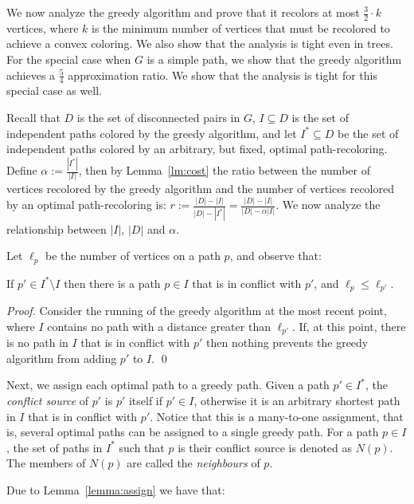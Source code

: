 We now analyze the greedy algorithm and prove that it recolors at most 
$\frac{3}{2} \cdot k$ vertices, 
where $k$ is the minimum number of vertices that must be recolored to achieve a convex
coloring.
%
We also show that the analysis is tight even in trees.
%
For the special case when $G$ is a simple path, 
we show that the greedy algorithm achieves a $\frac{5}{4}$ approximation ratio.
We show that the analysis is tight for this special case as well.

Recall that $D$ is the set of disconnected pairs in $G$, 
$I \subseteq D$ is the set of independent paths colored by the greedy algorithm, 
and let $I^* \subseteq D$ be the set of independent paths colored by an arbitrary, 
but fixed,
optimal path-recoloring.  
%
Define $\alpha := \frac{|I^*|}{|I|}$,
then by Lemma~\ref{lm:cost} the ratio between the number of 
vertices recolored by the greedy algorithm and the number of vertices
recolored by an optimal path-recoloring is:
$
r := \frac{|D| - |I|}{|D| - |I^*|}
= \frac{|D| - |I|}{|D| - \alpha |I|}
$.
We now analyze the relationship between $|I|$, $|D|$ and $\alpha$.

Let $\ell_p$ be the number of vertices on a path $p$, and observe that:

\begin{lemma}
\label{lemma:assign}
If $p' \in I^* \setminus I$ then there is a path $p \in I$ that is in
conflict with $p'$, and $\ell_p \leq \ell_{p'}$.
\end{lemma}
\begin{proof}
Consider the running of the greedy algorithm at the most recent point,
where $I$ contains no path with a distance greater than $\ell_{p'}$.  If,
at this point, there is no path in $I$ that is in conflict with $p'$
then nothing prevents the greedy algorithm from adding $p'$ to $I$.
\qed{}\end{proof}

Next, we assign each optimal path to a greedy path.
%
Given a path $p' \in I^*$, the \emph{conflict source} of $p'$ is $p'$
itself if $p' \in I$, otherwise it is an arbitrary shortest path in
$I$ that is in conflict with $p'$.
%
Notice that this is a many-to-one assignment, that is, several optimal
paths can be assigned to a single greedy path.
%
For a path $p \in I$, the set of paths in $I^*$ such that $p$ is their
conflict source is denoted as $N(p)$.  The members of $N(p)$ are
called the \emph{neighbours} of $p$.

Due to Lemma~\ref{lemma:assign} we have that:

